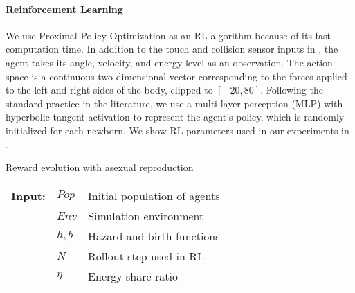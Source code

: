 \paragraph{Reinforcement Learning}
We use Proximal Policy Optimization \citep{schulmanProximalPolicyOptimization2017} as an RL algorithm because of its fast computation time. In addition to the touch and collision sensor inputs in , the agent takes its angle, velocity, and energy level as an observation. The action space is a continuous two-dimensional vector corresponding to the forces applied to the left and right sides of the body, clipped to $[-20, 80]$. Following the standard practice in the literature, we use a multi-layer perception (MLP) with hyperbolic tangent activation to represent the agent's policy, which is randomly initialized for each newborn. We show RL parameters used in our experiments in .

\begin{algorithm}[t]
  \caption{Reward evolution with asexual reproduction}\label{alg:reward-evo}
  \begin{tabular}{lll}
    \textbf{Input:} & $Pop$ & Initial population of agents \\
                    & $Env$ & Simulation environment \\
                    & $h, b$ & Hazard and birth functions \\
                    & $N$ & Rollout step used in RL \\
                    & $\eta$ & Energy share ratio
  \end{tabular}
  \begin{algorithmic}[1]
    \Loop{}
      \EndOnce{}
    \EndFor{}
       
      \EndWith{}
       
      \EndWith{}
    \EndFor{}
  \EndLoop{}
\end{algorithmic}
\end{algorithm}

